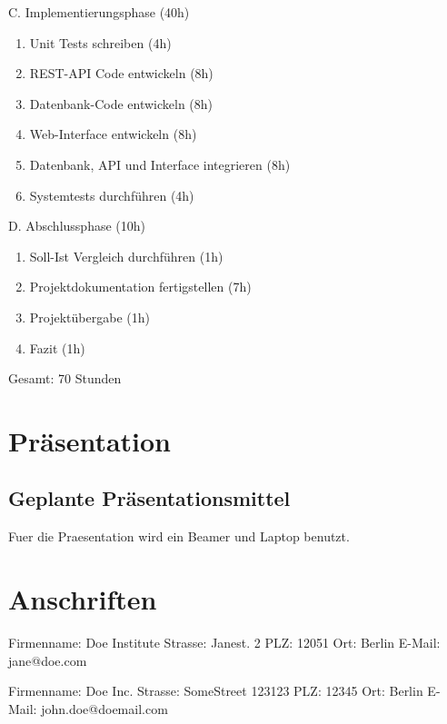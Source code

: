 \documentclass[11pt, a4paper]{article}
\begin{document}
\noindent C. Implementierungsphase (40h)
\begin{enumerate}
  \item Unit Tests schreiben (4h)
  \item REST-API Code entwickeln (8h)
  \item Datenbank-Code entwickeln (8h)
  \item Web-Interface entwickeln (8h)
  \item Datenbank, API und Interface integrieren (8h)
  \item Systemtests durchführen (4h)
\end{enumerate}

\noindent D. Abschlussphase (10h)
\begin{enumerate}
  \item Soll-Ist Vergleich durchführen (1h)
  \item Projektdokumentation fertigstellen (7h)
  \item Projektübergabe (1h)
  \item Fazit (1h)
\end{enumerate}

Gesamt: 70 Stunden

\section{Pr{\"a}sentation}
\subsection{Geplante Pr{\"a}sentationsmittel}
Fuer die Praesentation wird ein Beamer und Laptop benutzt.

\section{Anschriften}
\newline
Firmenname: Doe Institute\newline
Strasse: Janest. 2\newline
PLZ: 12051 \newline
Ort: Berlin\newline
E-Mail: jane@doe.com\newline

\newline
Firmenname: Doe Inc.\newline
Strasse: SomeStreet 123123\newline
PLZ: 12345\newline
Ort: Berlin\newline
E-Mail: john.doe@doemail.com\newline
\newpage
\end{document}
